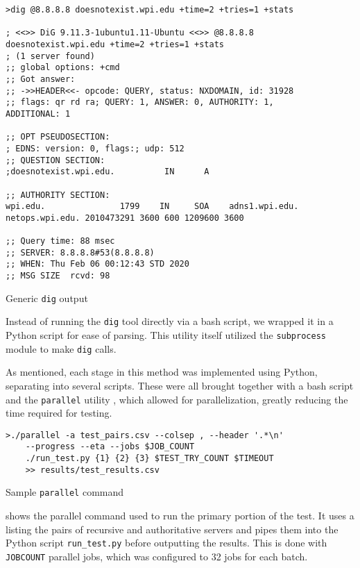 \begin{code}[htb]
    \centering
    \begin{verbatim}
>dig @8.8.8.8 doesnotexist.wpi.edu +time=2 +tries=1 +stats

; <<>> DiG 9.11.3-1ubuntu1.11-Ubuntu <<>> @8.8.8.8 
doesnotexist.wpi.edu +time=2 +tries=1 +stats
; (1 server found)
;; global options: +cmd
;; Got answer:
;; ->>HEADER<<- opcode: QUERY, status: NXDOMAIN, id: 31928
;; flags: qr rd ra; QUERY: 1, ANSWER: 0, AUTHORITY: 1, 
ADDITIONAL: 1

;; OPT PSEUDOSECTION:
; EDNS: version: 0, flags:; udp: 512
;; QUESTION SECTION:
;doesnotexist.wpi.edu.          IN      A

;; AUTHORITY SECTION:
wpi.edu.               1799    IN     SOA    adns1.wpi.edu.
netops.wpi.edu. 2010473291 3600 600 1209600 3600

;; Query time: 88 msec
;; SERVER: 8.8.8.8#53(8.8.8.8)
;; WHEN: Thu Feb 06 00:12:43 STD 2020
;; MSG SIZE  rcvd: 98
    \end{verbatim}
    \caption{Generic \texttt{dig} output}
    \label{fig:generic_dig_output}
\end{code}

Instead of running the \texttt{dig} tool directly via a bash script, we wrapped it in a Python script for ease of parsing. This utility itself utilized the \texttt{subprocess} module to make \texttt{dig} calls.

As mentioned, each stage in this method was implemented using Python, separating into several scripts. These were all brought together with a bash script and the \texttt{parallel} utility \cite{Tange2011}, which allowed for parallelization, greatly reducing the time required for testing.

\begin{code}[h]
    \centering
    \begin{minipage}{0.75\textwidth}
    \begin{verbatim}
>./parallel -a test_pairs.csv --colsep , --header '.*\n' 
    --progress --eta --jobs $JOB_COUNT 
    ./run_test.py {1} {2} {3} $TEST_TRY_COUNT $TIMEOUT 
    >> results/test_results.csv
    \end{verbatim}
    \end{minipage}
    \caption{Sample \texttt{parallel} command}
    \label{fig:dns_sample_parallel_command}
\end{code}

 shows the parallel command used to run the primary portion of the test. It uses a \csv listing the pairs of recursive and authoritative \dns servers and pipes them into the Python script \texttt{run\_test.py} before outputting the results. This is done with \texttt{JOBCOUNT} parallel jobs, which was configured to 32 jobs for each batch.

